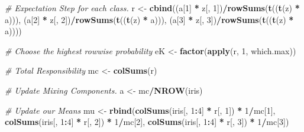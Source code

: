 \documentclass[12pt]{article}
\newenvironment{Shaded}{\begin{snugshade}}{\end{snugshade}}
\newcommand{\CommentTok}[1]{\textcolor[rgb]{0.56,0.35,0.01}{\textit{#1}}}
\newcommand{\DecValTok}[1]{\textcolor[rgb]{0.00,0.00,0.81}{#1}}
\newcommand{\FunctionTok}[1]{\textcolor[rgb]{0.13,0.29,0.53}{\textbf{#1}}}
\newcommand{\NormalTok}[1]{#1}
\newcommand{\OtherTok}[1]{\textcolor[rgb]{0.56,0.35,0.01}{#1}}
\newcommand{\SpecialCharTok}[1]{\textcolor[rgb]{0.81,0.36,0.00}{\textbf{#1}}}
\begin{document}
\begin{Shaded}
\begin{Highlighting}[]
\CommentTok{\# Expectation Step for each class.}
\NormalTok{r }\OtherTok{\textless{}{-}} \FunctionTok{cbind}\NormalTok{((a[}\DecValTok{1}\NormalTok{] }\SpecialCharTok{*}\NormalTok{ z[, }\DecValTok{1}\NormalTok{])}\SpecialCharTok{/}\FunctionTok{rowSums}\NormalTok{(}\FunctionTok{t}\NormalTok{((}\FunctionTok{t}\NormalTok{(z) }\SpecialCharTok{*}\NormalTok{ a))), (a[}\DecValTok{2}\NormalTok{] }\SpecialCharTok{*}\NormalTok{ z[, }\DecValTok{2}\NormalTok{])}\SpecialCharTok{/}\FunctionTok{rowSums}\NormalTok{(}\FunctionTok{t}\NormalTok{((}\FunctionTok{t}\NormalTok{(z) }\SpecialCharTok{*} 
\NormalTok{    a))), (a[}\DecValTok{3}\NormalTok{] }\SpecialCharTok{*}\NormalTok{ z[, }\DecValTok{3}\NormalTok{])}\SpecialCharTok{/}\FunctionTok{rowSums}\NormalTok{(}\FunctionTok{t}\NormalTok{((}\FunctionTok{t}\NormalTok{(z) }\SpecialCharTok{*}\NormalTok{ a))))}

\CommentTok{\# Choose the highest rowwise probability}
\NormalTok{eK }\OtherTok{\textless{}{-}} \FunctionTok{factor}\NormalTok{(}\FunctionTok{apply}\NormalTok{(r, }\DecValTok{1}\NormalTok{, which.max))}

\CommentTok{\# Total Responsibility}
\NormalTok{mc }\OtherTok{\textless{}{-}} \FunctionTok{colSums}\NormalTok{(r)}

\CommentTok{\# Update Mixing Components.}
\NormalTok{a }\OtherTok{\textless{}{-}}\NormalTok{ mc}\SpecialCharTok{/}\FunctionTok{NROW}\NormalTok{(iris)}

\CommentTok{\# Update our Means}
\NormalTok{mu }\OtherTok{\textless{}{-}} \FunctionTok{rbind}\NormalTok{(}\FunctionTok{colSums}\NormalTok{(iris[, }\DecValTok{1}\SpecialCharTok{:}\DecValTok{4}\NormalTok{] }\SpecialCharTok{*}\NormalTok{ r[, }\DecValTok{1}\NormalTok{]) }\SpecialCharTok{*} \DecValTok{1}\SpecialCharTok{/}\NormalTok{mc[}\DecValTok{1}\NormalTok{], }\FunctionTok{colSums}\NormalTok{(iris[, }\DecValTok{1}\SpecialCharTok{:}\DecValTok{4}\NormalTok{] }\SpecialCharTok{*} 
\NormalTok{    r[, }\DecValTok{2}\NormalTok{]) }\SpecialCharTok{*} \DecValTok{1}\SpecialCharTok{/}\NormalTok{mc[}\DecValTok{2}\NormalTok{], }\FunctionTok{colSums}\NormalTok{(iris[, }\DecValTok{1}\SpecialCharTok{:}\DecValTok{4}\NormalTok{] }\SpecialCharTok{*}\NormalTok{ r[, }\DecValTok{3}\NormalTok{]) }\SpecialCharTok{*} \DecValTok{1}\SpecialCharTok{/}\NormalTok{mc[}\DecValTok{3}\NormalTok{])}


\end{Highlighting}
\end{Shaded}
\end{document}
